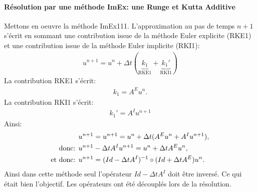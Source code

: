     \paragraph{Résolution par une méthode ImEx: une Runge et Kutta Additive}
            Mettons en oeuvre la méthode ImEx111. 
            L’approximation au pas de temps $n+1$ s'écrit en sommant une contribution issue de la méthode Euler explicite (RKE1)
            et une contribution issue de la méthode Euler implicite (RKI1):
            \begin{align}
                u^{n+1} = u^n + \Delta t (\underbrace{k_1}_{\text{RKE1}} + \underbrace{k_1'}_{\text{RKI1}})
            \end{align}
            La contribution RKE1 s'écrit:
            \begin{align}
                k_1 = A^E u^n.
            \end{align}
            La contribution RKI1 s'écrit:
            \begin{align}
                k_1' = A^I u^{n+1}
            \end{align}
            Ainsi: 
            \begin{align}
                &u^{n+1} = u^{n+1} = u^n + \Delta t ( A^E u^n +  A^I u^{n+1}),\\\notag
                \text{donc: }&u^{n+1} - \Delta t  A^I u^{n+1} = u^n + \Delta t  A^E u^n,\\\notag
                \text{et donc: }&u^{n+1} = (Id - \Delta t A^I)^{-1} \circ (Id + \Delta t A^E) u^n.
            \end{align}
            Ainsi dans cette méthode seul l’opérateur $Id- \Delta t A^I$ doit être inversé. Ce qui était bien l’objectif. Les opérateurs ont été 
            découplés lors de la résolution. 